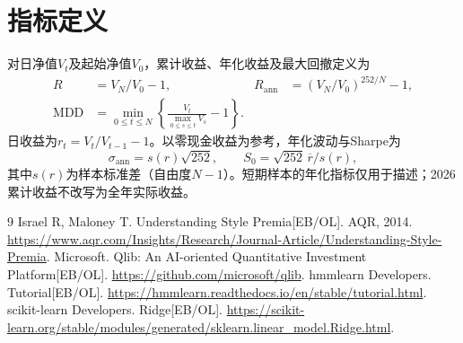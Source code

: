 \documentclass[12pt]{article}
\begin{document}
\section*{指标定义}
对日净值$V_t$及起始净值$V_0$，累计收益、年化收益及最大回撤定义为
\begin{align}
R&=V_N/V_0-1, & R_{\mathrm{ann}}&=(V_N/V_0)^{252/N}-1,\\
\mathrm{MDD}&=\min_{0\le t\le N}\left\{\frac{V_t}{\max_{0\le s\le t}V_s}-1\right\}.
\end{align}
日收益为$r_t=V_t/V_{t-1}-1$。以零现金收益为参考，年化波动与Sharpe为
\begin{equation}\sigma_{\mathrm{ann}}=s(r)\sqrt{252},\qquad S_0=\sqrt{252}\,\overline r/s(r),\end{equation}
其中$s(r)$为样本标准差（自由度$N-1$）。短期样本的年化指标仅用于描述；2026累计收益不改写为全年实际收益。
\begingroup\raggedright\begin{thebibliography}{9}
 Israel R, Maloney T. Understanding Style Premia[EB/OL]. AQR, 2014. \url{https://www.aqr.com/Insights/Research/Journal-Article/Understanding-Style-Premia}.
 Microsoft. Qlib: An AI-oriented Quantitative Investment Platform[EB/OL]. \url{https://github.com/microsoft/qlib}.
 hmmlearn Developers. Tutorial[EB/OL]. \url{https://hmmlearn.readthedocs.io/en/stable/tutorial.html}.
 scikit-learn Developers. Ridge[EB/OL]. \url{https://scikit-learn.org/stable/modules/generated/sklearn.linear_model.Ridge.html}.
\end{thebibliography}\endgroup
\end{document}
